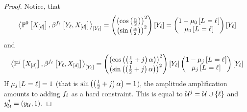 \begin{proof}
    Notice, that
    \begin{align*}
        \contractionof{\probofat{0}{\shortcatvariables},\bencodingofat{\formulaof{\selindex}}{\headvariableof{\selindex},\shortcatvariables}}{\headvariableof{\selindex}}
        = \coloredmatrixof{
            \left(\cosof{\frac{\rotanglesymbol}{2}}\right)^2 \\
            \left(\sinof{\frac{\rotanglesymbol}{2}}\right)^2
        }{\headvariableof{\selindex}}
        = \coloredmatrixof{
            1-\meanparamofat{0}{\indexedselvariable} \\
            \meanparamofat{0}{\indexedselvariable}
        }{\headvariableof{\selindex}}
    \end{align*}
    and
    \begin{align*}
        \contractionof{\probofat{\repnum}{\shortcatvariables},\bencodingofat{\formulaof{\selindex}}{\headvariableof{\selindex},\shortcatvariables}}{\headvariableof{\selindex}}
        =
        \coloredmatrixof{
            \left(\cosof{\left(\frac{1}{2}+\repnum\right)\rotanglesymbol}\right)^2 \\
            \left(\sinof{\left(\frac{1}{2}+\repnum\right)\rotanglesymbol}\right)^2
        }{\headvariableof{\selindex}}
        \coloredmatrixof{
            1-\meanparamofat{\repnum}{\indexedselvariable} \\
            \meanparamofat{\repnum}{\indexedselvariable}
        }{\headvariableof{\selindex}}
    \end{align*}
    If $\mu_{j}\left[L_{}=\ell_{}\right]=1$ (that is $\mathrm{sin}\left(\left(\frac{1}{2}+j\right)\alpha\right)=1$), the amplitude amplification amounts to adding $f_{\ell}$ as a hard constraint.
    This is equal to $\mathcal{U}^{j}=\mathcal{U}\cup\{\ell\}$ and $y_{\mathcal{U}}^{j}=(y_{\mathcal{U}},1)$.


\end{proof}
